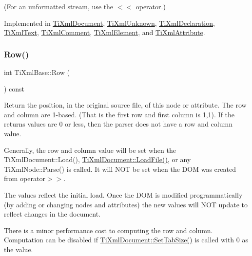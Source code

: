 (For an unformatted stream, use the $<$$<$ operator.) 

Implemented in \hyperlink{class_ti_xml_document_aa9e166fae51da603641380a964f21eeb}{Ti\+Xml\+Document}, \hyperlink{class_ti_xml_unknown_a5793fbc48ab3419783c0e866ca2d334e}{Ti\+Xml\+Unknown}, \hyperlink{class_ti_xml_declaration_ae46cff6565f299210ab945e78bf28514}{Ti\+Xml\+Declaration}, \hyperlink{class_ti_xml_text_a75f6895906333894e2574cc8cf77ea79}{Ti\+Xml\+Text}, \hyperlink{class_ti_xml_comment_a873171beac19d40f0eaae945711c98ed}{Ti\+Xml\+Comment}, \hyperlink{class_ti_xml_element_aa31a15cddfb8601a31236fe7d2569fb4}{Ti\+Xml\+Element}, and \hyperlink{class_ti_xml_attribute_a68ae373e03b9c35be4c9d0c3c233b894}{Ti\+Xml\+Attribute}.

\mbox{\label{class_ti_xml_base_ad0cacca5d76d156b26511f46080b442e}} 
\subsubsection{\texorpdfstring{Row()}{Row()}}
{\footnotesize\ttfamily int Ti\+Xml\+Base\+::\+Row (\begin{DoxyParamCaption}{ }\end{DoxyParamCaption}) const\hspace{0.3cm}{\ttfamily [inline]}}

Return the position, in the original source file, of this node or attribute. The row and column are 1-\/based. (That is the first row and first column is 1,1). If the returns values are 0 or less, then the parser does not have a row and column value.

Generally, the row and column value will be set when the Ti\+Xml\+Document\+::\+Load(), \hyperlink{class_ti_xml_document_a4c852a889c02cf251117fd1d9fe1845f}{Ti\+Xml\+Document\+::\+Load\+File()}, or any Ti\+Xml\+Node\+::\+Parse() is called. It will N\+OT be set when the D\+OM was created from operator$>$$>$.

The values reflect the initial load. Once the D\+OM is modified programmatically (by adding or changing nodes and attributes) the new values will N\+OT update to reflect changes in the document.

There is a minor performance cost to computing the row and column. Computation can be disabled if \hyperlink{class_ti_xml_document_a51dac56316f89b35bdb7d0d433ba988e}{Ti\+Xml\+Document\+::\+Set\+Tab\+Size()} is called with 0 as the value.

